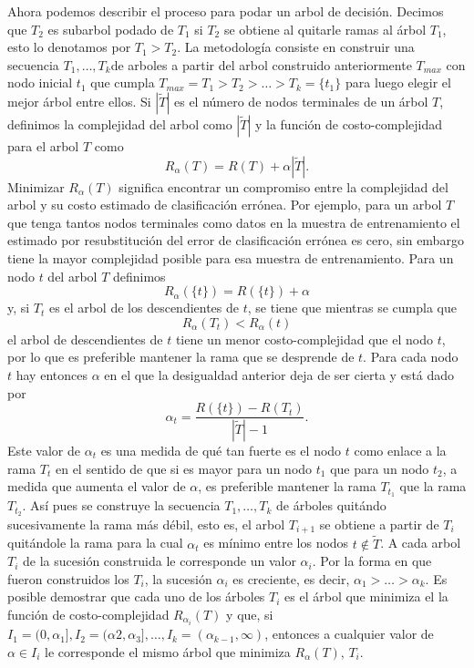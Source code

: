 \documentclass[letterpaper,12pt]{book}
\begin{document}
Ahora podemos describir el proceso para podar un arbol de decisión. Decimos que  $T_2$ es subarbol podado de $T_1$ si $T_2$ se obtiene al quitarle ramas al árbol $T_1$, esto lo denotamos por $T_1>T_2$. La metodología consiste en construir una secuencia $T_1,\dots,T_k$de arboles a partir del arbol construido anteriormente $T_{max}$ con nodo inicial $t_1$ que cumpla $T_{max} = T_1>T_2>\dots>T_{k}=\{t_1\}$ para luego elegir el mejor árbol entre ellos. Si $|\widetilde{T}|$ es el número de nodos terminales de un árbol $T$, definimos la complejidad del arbol como $|\widetilde{T}|$ y la función de costo-complejidad para el arbol $T$ como
\begin{equation}
R_{\alpha}(T) = R(T)+\alpha|\tilde{T}|.
\end{equation}
Minimizar $R_{\alpha}(T)$ significa encontrar un compromiso entre la complejidad del arbol y su costo estimado de clasificación errónea. Por ejemplo, para un arbol $T$ que tenga tantos nodos terminales como datos en la muestra de entrenamiento el estimado por resubstitución del error de clasificación errónea es cero, sin embargo tiene la mayor complejidad posible para esa muestra de entrenamiento. Para un nodo $t$ del arbol $T$ definimos
\begin{equation}
R_{\alpha}(\{t\}) = R(\{t\})+\alpha
\end{equation}
y, si $T_t$ es el arbol de los descendientes de $t$, se tiene que mientras se cumpla que
\begin{equation}
R_{\alpha}(T_{t}) < R_{\alpha}(t)
\end{equation}
el arbol de descendientes de $t$ tiene un menor costo-complejidad que el nodo $t$, por lo que es preferible mantener la rama que se desprende de $t$. Para cada nodo $t$ hay entonces $\alpha$ en el que la desigualdad anterior deja de ser cierta y está dado por
\begin{equation}
\alpha_t = \frac{R(\{t\})-R(T_t)}{|\tilde{T}|-1}. 
\end{equation} 
Este valor de $\alpha_t$ es una medida de qué tan fuerte es el nodo $t$ como enlace a la rama $T_t$ en el sentido de que si es mayor para un nodo $t_1$ que para un nodo $t_2$, a medida que aumenta el valor de $\alpha$, es preferible mantener la rama $T_{t_1}$ que la rama $T_{t_2}$. Así pues se construye la secuencia $T_1,\dots,T_k$ de árboles quitándo sucesivamente la rama más débil, esto es, el arbol $T_{i+1}$ se obtiene a partir de $T_{i}$ quitándole la rama para la cual $\alpha_t$ es mínimo entre los nodos $t\notin \widetilde{T}$. A cada arbol $T_i$ de la sucesión construida le corresponde un valor $\alpha_i$. Por la forma en que fueron construidos los $T_i$, la sucesión $\alpha_i$ es creciente, es decir, $\alpha_1>\dots>\alpha_k$. Es posible demostrar que cada uno de los árboles $T_i$ es el árbol que minimiza el la función de costo-complejidad  $R_{\alpha_i}(T)$ y que, si $I_1 = (0,\alpha_1],I_2 =(\alpha2,\alpha_3],\dots,I_k=(\alpha_{k-1},\infty)$, entonces a cualquier valor de $\alpha\in I_i$ le corresponde el mismo árbol que minimiza $R_\alpha(T)$, $T_i$.
\end{document}

